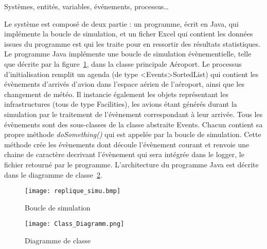 Systèmes, entités, variables, événements, processus… 

Le système est composé de deux partie : un programme, écrit en Java,  qui implémente la boucle de simulation, et un ficher Excel qui contient les données issues du programme est qui les traite pour en ressortir des résultats statistiques.
\\
Le programme Java implémente une boucle de simulation évènementielle, telle que décrite par la figure~\ref{replique}, dans la classe principale Aéroport. 
Le processus d'initialisation remplit un agenda (de type <Events>SortedList) qui contient les évènements d'arrivés d'avion dans l'espace aérien de l'aéroport, ainsi que les changement de météo. Il instancie également les objets représentant les infrastructures (tous de type Facilities), les avions étant générés durant la simulation par le traitement de l'évènement correspondant à leur arrivée.
Tous les évènements sont des sous-classes de la classe abstraite Events. Chacun contient sa propre méthode \textit{doSomething()} qui est appelée par la boucle de simulation. Cette méthode crée les évènements dont découle l'évènement courant et renvoie une chaine de caractère decrivant l'évènement qui sera intégrée dans le logger, le fichier retourné par le programme.
L'architecture du programme Java est décrite dans le diagramme de classe~\ref{class_diagramm}.

 \begin{figure}[h]
   \caption{\label{replique} Boucle de simulation}
 \texttt{[image: replique\_simu.bmp]}
 \end{figure}


\begin{figure}[h]
   \caption{\label{class_diagramm} Diagramme de classe}
 \texttt{[image: Class\_Diagramm.png]}
 \end{figure}
 
